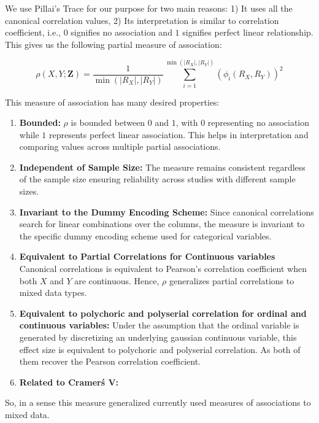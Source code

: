 \documentclass{uai2025} %
\begin{document}
We use Pillai's Trace for our purpose for two main reasons: 1) It uses all the
canonical correlation values, 2) Its interpretation is similar to correlation
coefficient, i.e., $ 0 $ signifies no association and $ 1 $ signifies perfect
linear relationship. This gives us the following partial measure of
association:

\begin{equation}
	\rho(X, Y; \bm{Z}) = \frac{1}{\min(\rvert R_X \rvert, \rvert R_Y \rvert)}
	\sum_{i=1}^{\min(\rvert R_X \rvert, \rvert R_Y \rvert)} (\phi_i(R_X, R_Y))^2
\end{equation}

This measure of association has many desired properties:

\begin{enumerate}
	\item \textbf{Bounded: } $ \rho $ is bounded between $ 0 $ and $ 1 $,
		with $ 0 $ representing no association while $ 1 $ represents
		perfect linear association. This helps in interpretation and
		comparing values across multiple partial associations.
	\item \textbf{Independent of Sample Size: } The measure remains consistent
		regardless of the sample size ensuring reliability across 
		studies with different sample sizes.
	\item \textbf{Invariant to the Dummy Encoding Scheme: } Since canonical
		correlations search for linear combinations over the columns,
		the measure is invariant to the specific dummy encoding
		scheme used for categorical variables.
	\item \textbf{Equivalent to Partial Correlations for Continuous variables}
		Canonical correlations is equivalent to Pearson's correlation coefficient
		when both $ X $ and $ Y $ are continuous. Hence, $ \rho $ generalizes
		partial correlations to mixed data types.
	\item \textbf{Equivalent to polychoric and polyserial correlation for ordinal and continuous variables: }
		Under the assumption that the ordinal variable is generated by
		discretizing an underlying gaussian continuous variable, this
		effect size is equivalent to polychoric and polyserial
		correlation. As both of them recover the Pearson correlation
		coefficient.
	\item \textbf{Related to Cramer\'s V: } 
\end{enumerate}

So, in a sense this measure generalized currently used measures of associations
to mixed data.
\end{document}
